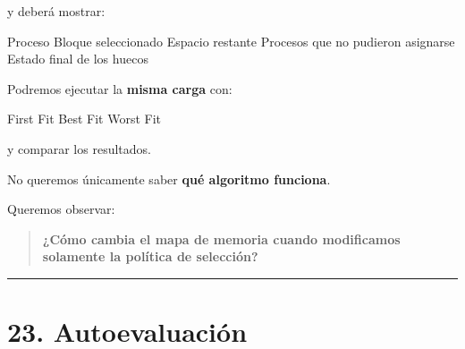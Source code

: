 \documentclass[
  spanish,
  letterpaper,
]{scrbook}
\newenvironment{Shaded}{\begin{snugshade}}{\end{snugshade}}
\newcommand{\NormalTok}[1]{\textcolor[rgb]{0.00,0.23,0.31}{#1}}
\begin{document}
y deberá mostrar:

\begin{Shaded}
\begin{Highlighting}[]
\NormalTok{Proceso}
\NormalTok{Bloque seleccionado}
\NormalTok{Espacio restante}
\NormalTok{Procesos que no pudieron asignarse}
\NormalTok{Estado final de los huecos}
\end{Highlighting}
\end{Shaded}

Podremos ejecutar la \textbf{misma carga} con:

\begin{Shaded}
\begin{Highlighting}[]
\NormalTok{First Fit}
\NormalTok{Best Fit}
\NormalTok{Worst Fit}
\end{Highlighting}
\end{Shaded}

y comparar los resultados.

\begin{tcolorbox}[enhanced jigsaw, arc=.35mm, bottomrule=.15mm, bottomtitle=1mm, breakable, colback=white, colbacktitle=quarto-callout-tip-color!10!white, colframe=quarto-callout-tip-color-frame, coltitle=black, left=2mm, leftrule=.75mm, opacityback=0, opacitybacktitle=0.6, rightrule=.15mm, title=\textcolor{quarto-callout-tip-color}{\faLightbulb}\hspace{0.5em}{La pregunta del laboratorio}, titlerule=0mm, toprule=.15mm, toptitle=1mm]

No queremos únicamente saber \textbf{qué algoritmo funciona}.

Queremos observar:

\begin{quote}
\textbf{¿Cómo cambia el mapa de memoria cuando modificamos solamente la
política de selección?}
\end{quote}

\end{tcolorbox}

\begin{center}\rule{0.5\linewidth}{0.5pt}\end{center}


\chapter{23. Autoevaluación}\label{autoevaluaciuxf3n-11}
\end{document}
